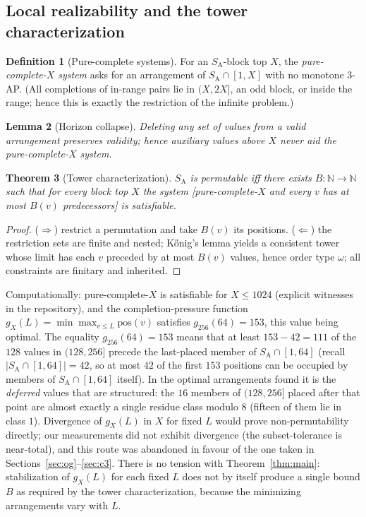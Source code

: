 \documentclass[11pt]{article}
\newtheorem{theorem}{Theorem}
\newtheorem{lemma}[theorem]{Lemma}
\theoremstyle{definition}
\newtheorem{definition}[theorem]{Definition}
\newcommand{\N}{\mathbb{N}}
\newcommand{\SA}{S_{\mathrm{A}}}
\newcommand{\pos}{\mathrm{pos}}
\begin{document}
\subsection{Local realizability and the tower characterization}

\begin{definition}[Pure-complete systems]
For an $\SA$-block top $X$, the \emph{pure-complete-$X$ system} asks for an
arrangement of $\SA \cap [1, X]$ with no monotone 3-AP. (All completions of
in-range pairs lie in $(X, 2X]$, an odd block, or inside the range; hence this
is exactly the restriction of the infinite problem.)
\end{definition}

\begin{lemma}[Horizon collapse]
Deleting any set of values from a valid arrangement preserves validity; hence
auxiliary values above $X$ never aid the pure-complete-$X$ system.
\end{lemma}

\begin{theorem}[Tower characterization]
$\SA$ is permutable iff there exists $B\colon \N \to \N$ such that for every
block top $X$ the system [pure-complete-$X$ and every $v$ has at most $B(v)$
predecessors] is satisfiable.
\end{theorem}

\begin{proof}
($\Rightarrow$) restrict a permutation and take $B(v)$ its positions.
($\Leftarrow$) the restriction sets are finite and nested; K\H{o}nig's lemma
yields a consistent tower whose limit has each $v$ preceded by at most $B(v)$
values, hence order type $\omega$; all constraints are finitary and inherited.
\end{proof}

Computationally: pure-complete-$X$ is satisfiable for $X \le 1024$
(explicit witnesses in the repository), and the completion-pressure function
$g_X(L) = \min \max_{v \le L} \pos(v)$ satisfies $g_{256}(64) = 153$,
this value being optimal. The equality $g_{256}(64) = 153$ means that at
least $153 - 42 = 111$ of the $128$ values in $(128,256]$ precede the
last-placed member of $\SA \cap [1,64]$ (recall
$|\SA \cap [1,64]| = 42$, so at most $42$ of the first $153$ positions can
be occupied by members of $\SA \cap [1,64]$ itself). In the optimal
arrangements found it is the \emph{deferred} values that are structured: the
$16$ members of $(128,256]$ placed after that point are almost exactly a
single residue class modulo $8$ (fifteen of them lie in class $1$).
Divergence of $g_X(L)$ in $X$ for fixed $L$ would prove
non-permutability directly; our measurements did not exhibit divergence
(the subset-tolerance is near-total), and this route was abandoned in favour
of the one taken in Sections~\ref{sec:og}--\ref{sec:c3}. There is no
tension with Theorem~\ref{thm:main}: stabilization of $g_X(L)$ for each
fixed $L$ does not by itself produce a single bound $B$ as required by the
tower characterization, because the minimizing arrangements vary with $L$.
\end{document}
